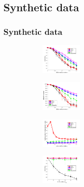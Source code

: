 \documentclass[hyperref={pdfpagelabels=false}]{beamer}
\begin{document}
\subsection{Synthetic data}
\begin{frame}[allowframebreaks]
\frametitle{Synthetic data}
\centering

\begin{figure}
	\begin{subfigure}[b] {0.32\textwidth}
		\centering
		\includegraphics[width=2cm]{"fig/evaluation/SyntheticTest/no_descr/Results_v4.3.3/Test2/accuracy_avg10t"} 
	\end{subfigure}
	\begin{subfigure}[b] {0.32\textwidth}
		\centering
		\includegraphics[width=2cm]{"fig/evaluation/SyntheticTest/no_descr/Results_v4.3.3/Test2/score_avg10t"} 
	\end{subfigure} 
	\begin{subfigure}[b] {0.32\textwidth}
		\centering
		\includegraphics[width=2cm]{"fig/evaluation/SyntheticTest/no_descr/Results_v4.3.3/Test2/time_summary_avg10t"} 
	\end{subfigure} 
\end{figure}
\vspace{-20pt}
\begin{figure}
	\begin{subfigure}[b]{0.32\textwidth}
		\centering
		\includegraphics[width=2cm]{"fig/evaluation/SyntheticTest/no_descr/Results_v4.3.3/Test3/accuracy_avg10t"} 

\end{subfigure}
\end{figure}
\end{frame}
\end{document}
